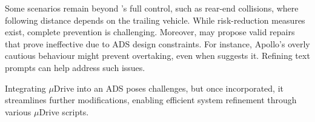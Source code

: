 Some scenarios remain beyond \coolname's full control, such as rear-end collisions, where following distance depends on the trailing vehicle. While risk-reduction measures exist, complete prevention is challenging. Moreover, \coolname may propose valid repairs that prove ineffective due to ADS design constraints. For instance, Apollo’s overly cautious behaviour might prevent overtaking, even when \coolname suggests it. Refining text prompts can help address such issues.

Integrating $\mu$Drive into an ADS poses challenges, but once incorporated, it streamlines further modifications, enabling efficient system refinement through various $\mu$Drive scripts.


